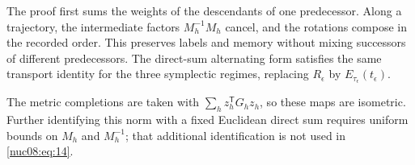 The proof first sums the weights of the descendants of one predecessor. Along a trajectory, the intermediate factors \(M_h^{-1}M_h\) cancel, and the rotations compose in the recorded order. This preserves labels and memory without mixing successors of different predecessors. The direct-sum alternating form satisfies the same transport identity for the three symplectic regimes, replacing \(R_\epsilon\) by \(E_{\tau_\epsilon}(t_\epsilon)\).

The metric completions are taken with \(\sum_h z_h^\mathsf TG_hz_h\), so these maps are isometric. Further identifying this norm with a fixed Euclidean direct sum requires uniform bounds on \(M_h\) and \(M_h^{-1}\); that additional identification is not used in \eqref{nuc08:eq:14}.
